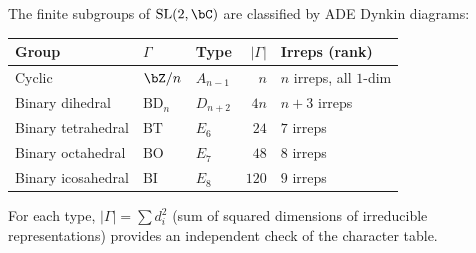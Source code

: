 \begin{example}
\label{ex:ade-classification}
The finite subgroups of $\mathrm{SL}(2,\bC)$ are classified by
ADE Dynkin diagrams:
\begin{center}
\small
\renewcommand{\arraystretch}{1.2}
\begin{tabular}{lllrl}
\textbf{Group} & $\Gamma$ & \textbf{Type} & $|\Gamma|$
 & \textbf{Irreps (rank)} \\
\hline
Cyclic & $\bZ/n$ & $A_{n-1}$ & $n$ & $n$ irreps, all $1$-dim \\
Binary dihedral & $\mathrm{BD}_n$ & $D_{n+2}$ & $4n$ & $n+3$ irreps \\
Binary tetrahedral & $\mathrm{BT}$ & $E_6$ & $24$ & $7$ irreps \\
Binary octahedral & $\mathrm{BO}$ & $E_7$ & $48$ & $8$ irreps \\
Binary icosahedral & $\mathrm{BI}$ & $E_8$ & $120$ & $9$ irreps
\end{tabular}
\end{center}
For each type, $|\Gamma| = \sum d_i^2$ (sum of squared dimensions
of irreducible representations) provides an independent check of
the character table.
\end{example}

